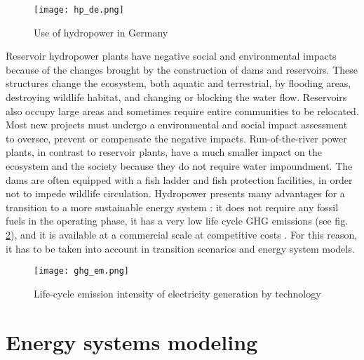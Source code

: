 \begin{figure}[H]
\centering
\texttt{[image: hp\_de.png]}
\caption[Use of hydropower in Germany]{Use of hydropower in Germany \cite{bdew}}
\label{hp_de}
\end{figure}

Reservoir hydropower plants have negative social and environmental impacts because of the changes brought by the construction of dams and reservoirs. These structures change the ecosystem, both aquatic and terrestrial, by flooding areas, destroying wildlife habitat, and changing or blocking the water flow. Reservoirs also occupy large areas and sometimes require entire communities to be relocated. Most new projects must undergo a environmental and social impact assessment to oversee, prevent or compensate the negative impacts. Run-of-the-river power plants, in contrast to reservoir plants, have a much smaller impact on the ecosystem and the society because they do not require water impoundment. The dams are often equipped with a fish ladder and fish protection facilities, in order not to impede wildlife circulation. \newline 
Hydropower presents many advantages for a transition to a more sustainable energy system : it does not require any fossil fuels in the operating phase, it has a very low life cycle GHG emissions (see fig. \ref{ghg_em}), and it is available at a commercial scale at competitive costs \cite{hp_europe}. For this reason, it has to be taken into account in transition scenarios and energy system models. 

\begin{figure}[H]
\centering
\texttt{[image: ghg\_em.png]}
\caption[Life-cycle emission intensity of electricity generation by technology]{Life-cycle emission intensity of electricity generation by technology \cite{hp_europe}}
\label{ghg_em}
\end{figure}


\section{Energy systems modeling}

